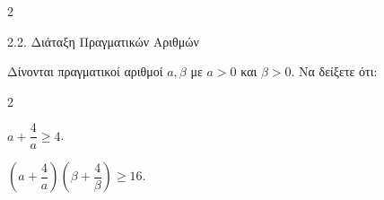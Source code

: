 \begin{ylh}{2}
    \item 2.2. Διάταξη Πραγματικών Αριθμών
\end{ylh}
Δίνονται πραγματικοί αριθμοί $a, \beta$ με $a > 0$ και $\beta > 0$. Να δείξετε ότι:
\begin{multicols}{2}
\begin{alist}
\item $a + \dfrac{4}{a} \ge 4$.
\item $\left( a + \dfrac{4}{a} \right) \left( \beta + \dfrac{4}{\beta} \right) \ge 16$.
\end{alist}
\end{multicols}

